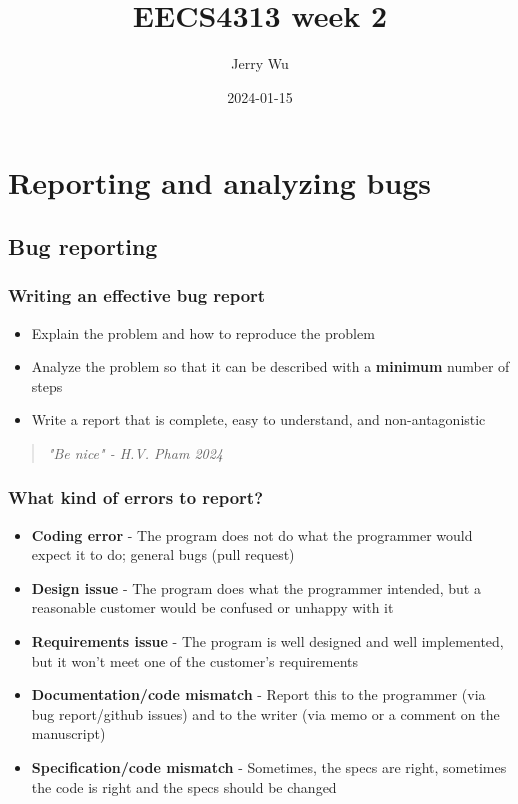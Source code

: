 \documentclass[12pt]{book}
\title{EECS4313 week 2}
\author{Jerry Wu}
\date{2024-01-15}
\begin{document}
\maketitle
\tableofcontents

\chapter{Reporting and analyzing bugs}

\section*{Bug reporting}
\subsection*{Writing an effective bug report}
\begin{itemize}
    \item Explain the problem and how to reproduce the problem
    \item Analyze the problem so that it can be described with a \textbf{minimum} number of steps
    \item Write a report that is complete, easy to understand, and non-antagonistic
\end{itemize}

\begin{quote}
    \textit{"Be nice" - H.V. Pham 2024}
\end{quote}

\subsection*{What kind of errors to report?}

\begin{itemize}
    \item \textbf{Coding error} - The program does not do what the programmer would expect it to do; general bugs (pull request)
    
    \item \textbf{Design issue} - The program does what the programmer intended, but a reasonable customer would be confused or unhappy with it
    
    \item \textbf{Requirements issue} - The program is well designed and well implemented, but it won't meet one of the customer's requirements
    
    \item \textbf{Documentation/code mismatch} - Report this to the programmer (via bug report/github issues) and to the writer (via memo or a comment on the manuscript)
    
    \item \textbf{Specification/code mismatch} - Sometimes, the specs are right, sometimes the code is right and the specs should be changed
\end{itemize}
\end{document}
